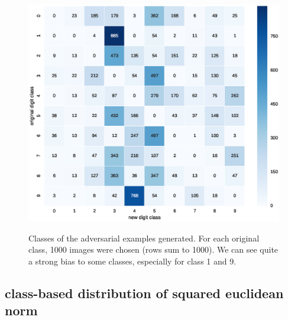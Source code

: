 \documentclass{article} %
\begin{document}
\begin{figure}[h!]
\begin{center}
\includegraphics[scale=0.6]{figs/sup_3}
\label{exp:sup_3}
\caption{\small Classes of the adversarial examples generated.
For each original class, 1000 images were chosen (rows sum to 1000). We can see quite a strong bias to some classes, especially
for class 1 and 9.}
\end{center}
\end{figure}

\clearpage

\subsection{class-based distribution of squared euclidean norm}
\end{document}
